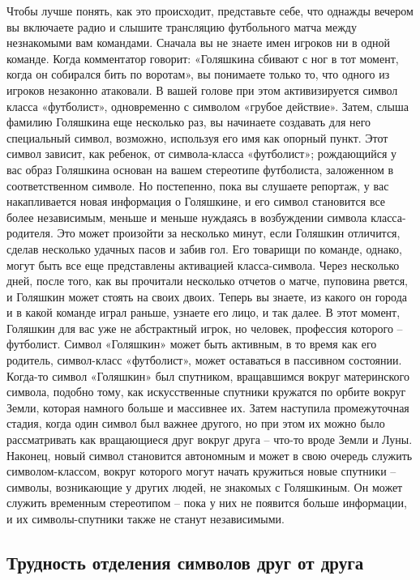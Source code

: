 \documentclass[../main.tex]{subfiles}
\begin{document}
Чтобы лучше понять, как это происходит, представьте себе, что однажды вечером вы включаете радио и слышите трансляцию футбольного матча между незнакомыми вам командами. Сначала вы не знаете имен игроков ни в одной команде. Когда комментатор говорит: «Голяшкина сбивают с ног в тот момент, когда он собирался бить по воротам», вы понимаете только то, что одного из игроков незаконно атаковали. В вашей голове при этом активизируется символ класса «футболист», одновременно с символом «грубое действие». Затем, слыша фамилию Голяшкина еще несколько раз, вы начинаете создавать для него специальный символ, возможно, используя его имя как опорный пункт. Этот символ зависит, как ребенок, от символа-класса «футболист»; рождающийся у вас образ Голяшкина основан на вашем стереотипе футболиста, заложенном в соответственном символе. Но постепенно, пока вы слушаете репортаж, у вас накапливается новая информация о Голяшкине, и его символ становится все более независимым, меньше и меньше нуждаясь в возбуждении символа класса-родителя. Это может произойти за несколько минут, если Голяшкин отличится, сделав несколько удачных пасов и забив гол. Его товарищи по команде, однако, могут быть все еще представлены активацией класса-символа. Через несколько дней, после того, как вы прочитали несколько отчетов о матче, пуповина рвется, и Голяшкин может стоять на своих двоих. Теперь вы знаете, из какого он города и в какой команде играл раньше, узнаете его лицо, и так далее. В этот момент, Голяшкин для вас уже не абстрактный игрок, но человек, профессия которого \--- футболист. Символ «Голяшкин» может быть активным, в то время как его родитель, символ-класс «футболист», может оставаться в пассивном состоянии. Когда-то символ «Голяшкин» был спутником, вращавшимся вокруг материнского символа, подобно тому, как искусственные спутники кружатся по орбите вокруг Земли, которая намного больше и массивнее их. Затем наступила промежуточная стадия, когда один символ был важнее другого, но при этом их можно было рассматривать как вращающиеся друг вокруг друга \--- что-то вроде Земли и Луны. Наконец, новый символ становится автономным и может в свою очередь служить символом-классом, вокруг которого могут начать кружиться новые спутники \--- символы, возникающие у других людей, не знакомых с Голяшкиным. Он может служить временным стереотипом \--- пока у них не появится больше информации, и их символы-спутники также не станут независимыми.


\subsection{Трудность отделения символов друг от друга}
\end{document}
